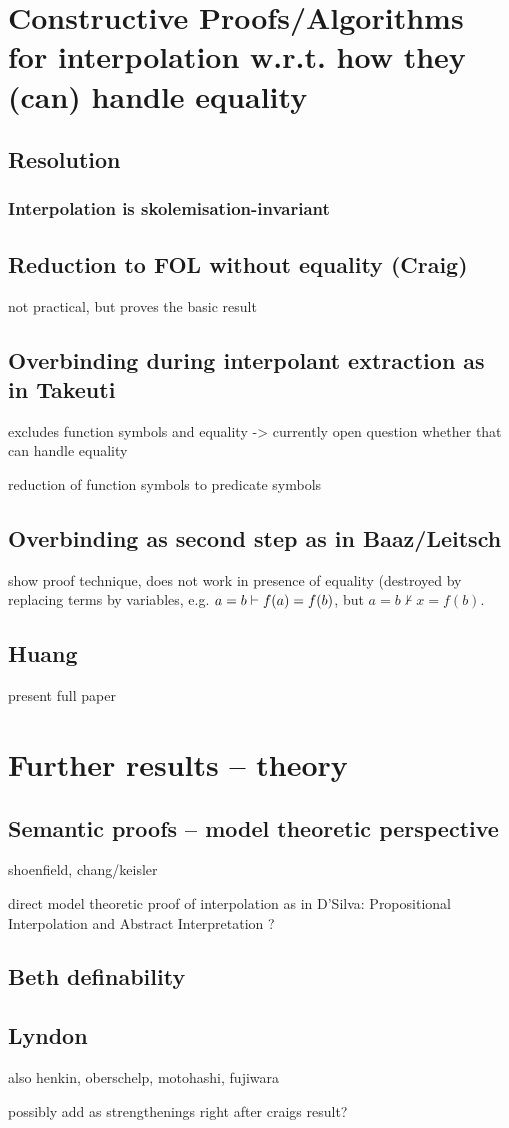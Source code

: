 \documentclass[,%
			paper=a4,%
			DIV12,
			liststotoc,
			bibtotoc,
			draft=false,%
			numbers=noendperiod
			]{scrartcl}
\theoremstyle{definition}
\begin{document}
\section{Constructive Proofs/Algorithms for interpolation w.r.t. how they (can) handle equality}

	\subsection{Resolution}
	\subsubsection{Interpolation is skolemisation-invariant}
	\subsection{Reduction to FOL without equality (Craig)}
		not practical, but proves the basic result
	\subsection{Overbinding during interpolant extraction as in Takeuti}
		excludes function symbols and equality
		-> currently open question whether that can handle equality

	 reduction of function symbols to predicate symbols 

	\subsection{Overbinding as second step as in Baaz/Leitsch}
		show proof technique, does not work in presence of equality (destroyed by replacing terms by variables, e.g. $ a=b \vdash f(a) = f(b) $, but $ a=b \nvdash x = f(b)$.
	
	\subsection{Huang}
		present full paper
		

\section{Further results -- theory}
	\subsection{Semantic proofs -- model theoretic perspective}
		shoenfield, chang/keisler

		direct model theoretic proof of interpolation as in D'Silva: Propositional Interpolation and Abstract Interpretation ?


	\subsection{Beth definability}


	\subsection{Lyndon}
	also henkin, oberschelp, motohashi, fujiwara

	possibly add as strengthenings right after craigs result?
\end{document}
